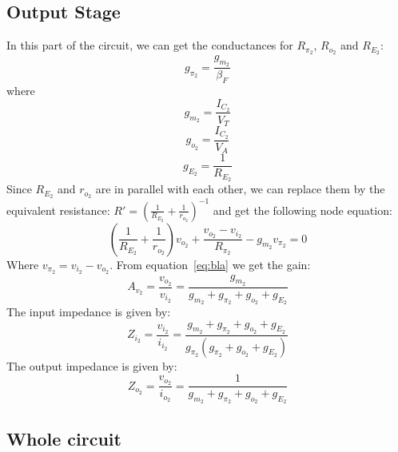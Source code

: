 \subsection{Output Stage}
In this part of the circuit, we can get the conductances for $R_{\pi_2}$, $R_{o_2}$ and $R_{E_2}$:
\begin{equation}
    g_{\pi_2}=\frac{g_{m_2}}{\beta_F}
\end{equation}
where
\begin{equation}
    g_{m_2}=\frac{I_{C_2}}{V_T}
\end{equation}
\begin{equation}
    g_{o_2}=\frac{I_{C_2}}{V_A}
\end{equation}
\begin{equation}
    g_{E_2}=\frac{1}{R_{E_2}}
\end{equation}
Since $R_{E_2}$ and $r_{o_2}$ are in parallel with each other, we can replace them by the equivalent resistance: $R'=\left(\frac{1}{R_{E_2}}+\frac{1}{r_{o_2}}\right)^{-1}$ and get the following node equation:
\begin{equation}\label{eq:bla}
    \left(\frac{1}{R_{E_2}}+\frac{1}{r_{o_2}}\right)v_{o_2}+\frac{v_{o_2}-v_{i_2}}{R_{\pi_2}}-g_{m_2}v_{\pi_2}=0
\end{equation}
Where $v_{\pi_2}=v_{i_2}-v_{o_2}$. From equation~\ref{eq:bla} we get the gain:
\begin{equation}
    A_{v_2}=\frac{v_{o_2}}{v_{i_2}}=\frac{g_{m_2}}{g_{m_2}+g_{\pi_2}+g_{o_2}+g_{E_2}}
\end{equation}
The input impedance is given by:
\begin{equation}
    Z_{i_2}=\frac{v_{i_2}}{i_{i_2}}= \frac{g_{m_2}+g_{\pi_2}+g_{o_2}+g_{E_2}}{g_{\pi_2}(g_{\pi_2}+g_{o_2}+g_{E_2})}
\end{equation}
The output impedance is given by:
\begin{equation}
    Z_{o_2}=\frac{v_{o_2}}{i_{o_2}}= \frac{1}{g_{m_2}+g_{\pi_2}+g_{o_2}+g_{E_2}}
\end{equation}


\subsection{Whole circuit}
